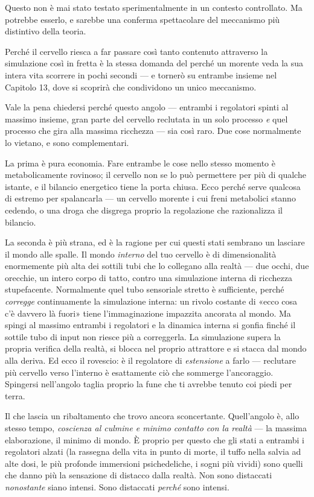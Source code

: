 \documentclass[11pt, twoside, openright]{book}
\begin{document}
Questo non è mai stato testato sperimentalmente in un contesto controllato. Ma potrebbe esserlo, e sarebbe una conferma spettacolare del meccanismo più distintivo della teoria.

Perché il cervello riesca a far passare così tanto contenuto attraverso la simulazione così in fretta è la stessa domanda del perché un morente veda la sua intera vita scorrere in pochi secondi --- e tornerò su entrambe insieme nel Capitolo 13, dove si scoprirà che condividono un unico meccanismo.

Vale la pena chiedersi perché questo angolo --- entrambi i regolatori spinti al massimo insieme, gran parte del cervello reclutata in un solo processo \textit{e} quel processo che gira alla massima ricchezza --- sia così raro. Due cose normalmente lo vietano, e sono complementari.

La prima è pura economia. Fare entrambe le cose nello stesso momento è metabolicamente rovinoso; il cervello non se lo può permettere per più di qualche istante, e il bilancio energetico tiene la porta chiusa. Ecco perché serve qualcosa di estremo per spalancarla --- un cervello morente i cui freni metabolici stanno cedendo, o una droga che disgrega proprio la regolazione che razionalizza il bilancio.

La seconda è più strana, ed è la ragione per cui questi stati sembrano un lasciare il mondo alle spalle. Il mondo \textit{interno} del tuo cervello è di dimensionalità enormemente più alta dei sottili tubi che lo collegano alla realtà --- due occhi, due orecchie, un intero corpo di tatto, contro una simulazione interna di ricchezza stupefacente. Normalmente quel tubo sensoriale stretto è sufficiente, perché \textit{corregge} continuamente la simulazione interna: un rivolo costante di «ecco cosa c'è davvero là fuori» tiene l'immaginazione impazzita ancorata al mondo. Ma spingi al massimo entrambi i regolatori e la dinamica interna si gonfia finché il sottile tubo di input non riesce più a correggerla. La simulazione supera la propria verifica della realtà, si blocca nel proprio attrattore e si stacca dal mondo alla deriva. Ed ecco il rovescio: è il regolatore di \textit{estensione} a farlo --- reclutare più cervello verso l'interno è esattamente ciò che sommerge l'ancoraggio. Spingersi nell'angolo taglia proprio la fune che ti avrebbe tenuto coi piedi per terra.

Il che lascia un ribaltamento che trovo ancora sconcertante. Quell'angolo è, allo stesso tempo, \textit{coscienza al culmine e minimo contatto con la realtà} --- la massima elaborazione, il minimo di mondo. È proprio per questo che gli stati a entrambi i regolatori alzati (la rassegna della vita in punto di morte, il tuffo nella salvia ad alte dosi, le più profonde immersioni psichedeliche, i sogni più vividi) sono quelli che danno più la sensazione di distacco dalla realtà. Non sono distaccati \textit{nonostante} siano intensi. Sono distaccati \textit{perché} sono intensi.
\end{document}
